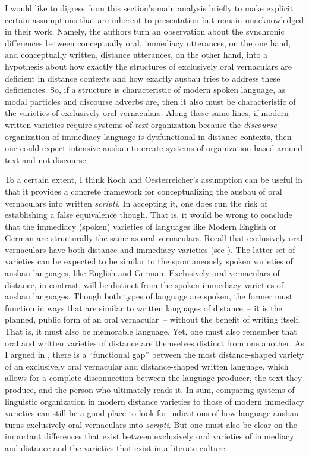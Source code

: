 I would like to digress from this section’s main analysis briefly to make explicit certain assumptions that are inherent to  presentation but remain unacknowledged in their work. Namely, the authors turn an observation about the synchronic differences between conceptually oral, immediacy utterances, on the one hand, and conceptually written, distance utterances, on the other hand, into a hypothesis about how exactly the structures of exclusively oral vernaculars are deficient in distance contexts and how exactly ausbau tries to address these deficiencies. So, if a structure is characteristic of modern spoken language, as modal particles and discourse adverbs are, then it also must be characteristic of the varieties of exclusively oral vernaculars. Along these same lines, if modern written varieties require systems of \textit{text} organization because the \textit{discourse} organization of immediacy language is dysfunctional in distance contexts, then one could expect intensive ausbau to create systems of organization based around text and not discourse.

To a certain extent, I think Koch and Oesterreicher’s assumption can be useful in that it provides a concrete framework for conceptualizing the ausbau of oral vernaculars into written \textit{scripti}. In accepting it, one does run the risk of establishing a false equivalence though. That is, it would be wrong to conclude that the immediacy (spoken) varieties of languages like Modern English or German are structurally the same as oral vernaculars. Recall that exclusively oral vernaculars have both distance and immediacy varieties (see ). The latter set of varieties can be expected to be similar to the spontaneously spoken varieties of ausbau languages, like English and German. Exclusively oral vernaculars of distance, in contrast, will be distinct from the spoken immediacy varieties of ausbau languages. Though both types of language are spoken, the former must function in ways that are similar to written languages of distance~-- it is the planned, public form of an oral vernacular~-- without the benefit of writing itself. That is, it must also be memorable language. Yet, one must also remember that oral and written varieties of distance are themselves distinct from one another. As I argued in , there is a “functional gap” between the most distance-shaped variety of an exclusively oral vernacular and distance-shaped written language, which allows for a complete disconnection between the language producer, the text they produce, and the person who ultimately reads it. In sum, comparing systems of linguistic organization in modern distance varieties to those of modern immediacy varieties can still be a good place to look for indications of how language ausbau turns exclusively oral vernaculars into \textit{scripti}. But one must also be clear on the important differences that exist between exclusively oral varieties of immediacy and distance and the varieties that exist in a literate culture.

